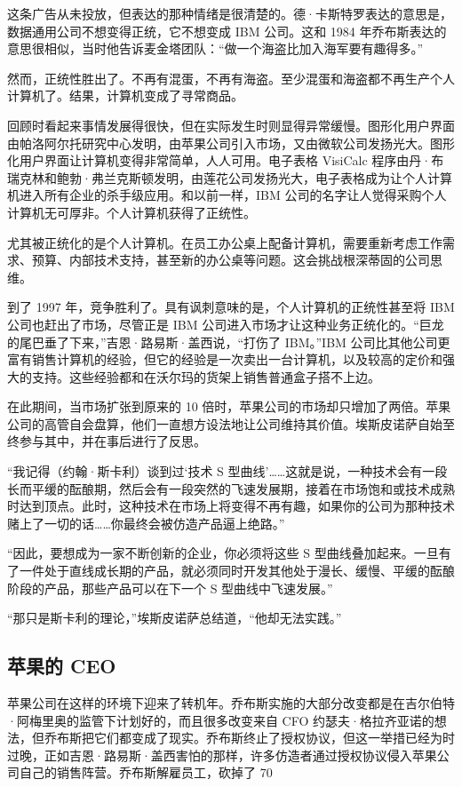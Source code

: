 \documentclass[12pt,UTF8]{ctexbook}
\begin{document}
这条广告从未投放，但表达的那种情绪是很清楚的。德·卡斯特罗表达的意思是，数据通用公司不想变得正统，它不想变成 IBM 公司。这和 1984 年乔布斯表达的意思很相似，当时他告诉麦金塔团队：“做一个海盗比加入海军要有趣得多。”

然而，正统性胜出了。不再有混蛋，不再有海盗。至少混蛋和海盗都不再生产个人计算机了。结果，计算机变成了寻常商品。

回顾时看起来事情发展得很快，但在实际发生时则显得异常缓慢。图形化用户界面由帕洛阿尔托研究中心发明，由苹果公司引入市场，又由微软公司发扬光大。图形化用户界面让计算机变得非常简单，人人可用。电子表格 VisiCalc 程序由丹·布瑞克林和鲍勃·弗兰克斯顿发明，由莲花公司发扬光大，电子表格成为让个人计算机进入所有企业的杀手级应用。和以前一样，IBM 公司的名字让人觉得采购个人计算机无可厚非。个人计算机获得了正统性。

尤其被正统化的是个人计算机。在员工办公桌上配备计算机，需要重新考虑工作需求、预算、内部技术支持，甚至新的办公桌等问题。这会挑战根深蒂固的公司思维。

到了 1997 年，竞争胜利了。具有讽刺意味的是，个人计算机的正统性甚至将 IBM 公司也赶出了市场，尽管正是 IBM 公司进入市场才让这种业务正统化的。“巨龙的尾巴垂了下来，”吉恩·路易斯·盖西说，“打伤了 IBM。”IBM 公司比其他公司更富有销售计算机的经验，但它的经验是一次卖出一台计算机，以及较高的定价和强大的支持。这些经验都和在沃尔玛的货架上销售普通盒子搭不上边。

在此期间，当市场扩张到原来的 10 倍时，苹果公司的市场却只增加了两倍。苹果公司的高管自会盘算，他们一直想方设法地让公司维持其价值。埃斯皮诺萨自始至终参与其中，并在事后进行了反思。

“我记得（约翰·斯卡利）谈到过‘技术 S 型曲线’……这就是说，一种技术会有一段长而平缓的酝酿期，然后会有一段突然的飞速发展期，接着在市场饱和或技术成熟时达到顶点。此时，这种技术在市场上将变得不再有趣，如果你的公司为那种技术赌上了一切的话……你最终会被仿造产品逼上绝路。”

“因此，要想成为一家不断创新的企业，你必须将这些 S 型曲线叠加起来。一旦有了一件处于直线成长期的产品，就必须同时开发其他处于漫长、缓慢、平缓的酝酿阶段的产品，那些产品可以在下一个 S 型曲线中飞速发展。”

“那只是斯卡利的理论，”埃斯皮诺萨总结道，“他却无法实践。”





\subsection{苹果的 CEO}


苹果公司在这样的环境下迎来了转机年。乔布斯实施的大部分改变都是在吉尔伯特·阿梅里奥的监管下计划好的，而且很多改变来自 CFO 约瑟夫·格拉齐亚诺的想法，但乔布斯把它们都变成了现实。乔布斯终止了授权协议，但这一举措已经为时过晚，正如吉恩·路易斯·盖西害怕的那样，许多仿造者通过授权协议侵入苹果公司自己的销售阵营。乔布斯解雇员工，砍掉了 70%
\end{document}
